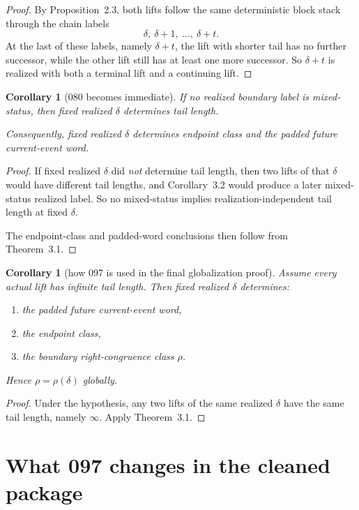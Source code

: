 \documentclass[11pt]{article}
\newtheorem{corollary}[theorem]{Corollary}
\begin{document}
\begin{proof}
By Proposition~2.3, both lifts follow the same deterministic block stack
through the chain labels
\[
\delta,\ \delta+1,\ \dots,\ \delta+t.
\]
At the last of these labels, namely $\delta+t$, the lift with shorter tail has
no further successor, while the other lift still has at least one more
successor. So $\delta+t$ is realized with both a terminal lift and a continuing
lift.
\end{proof}

\begin{corollary}[080 becomes immediate]
If no realized boundary label is mixed-status, then fixed realized $\delta$
determines tail length.

Consequently, fixed realized $\delta$ determines endpoint class and the padded
future current-event word.
\end{corollary}

\begin{proof}
If fixed realized $\delta$ did \emph{not} determine tail length, then two lifts
of that $\delta$ would have different tail lengths, and Corollary~3.2 would
produce a later mixed-status realized label. So no mixed-status implies
realization-independent tail length at fixed $\delta$.

The endpoint-class and padded-word conclusions then follow from Theorem~3.1.
\end{proof}

\begin{corollary}[how 097 is used in the final globalization proof]
Assume every actual lift has infinite tail length. Then fixed realized
$\delta$ determines:
\begin{enumerate}[label=\textup{(\arabic*)},leftmargin=2.5em]
\item the padded future current-event word,
\item the endpoint class,
\item the boundary right-congruence class $\rho$.
\end{enumerate}
Hence $\rho=\rho(\delta)$ globally.
\end{corollary}

\begin{proof}
Under the hypothesis, any two lifts of the same realized $\delta$ have the same
tail length, namely $\infty$. Apply Theorem~3.1.
\end{proof}

\section{What 097 changes in the cleaned package}
\end{document}
